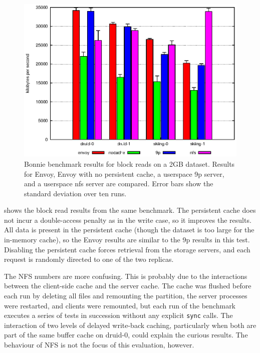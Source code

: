 \begin{figure}[t]
\centering
\includegraphics[width=\figwidth]{figures/bonnie-read}
\caption[Bonnie benchmark results for block reads]{Bonnie benchmark results for block reads on a 2GB dataset. Results for Envoy, Envoy with no persistent cache, a userspace 9p server, and a userspace nfs server are compared. Error bars show the standard deviation over ten runs.}
\label{fig:bonnie-read}
\end{figure}

 shows the block read results from the same benchmark. The persistent cache does not incur a double-access penalty as in the write case, so it improves the results. All data is present in the persistent cache (though the dataset is too large for the in-memory cache), so the Envoy results are similar to the 9p results in this test. Disabling the persistent cache forces retrieval from the storage servers, and each request is randomly directed to one of the two replicas.

The NFS numbers are more confusing. This is probably due to the interactions between the client-side cache and the server cache. The cache was flushed before each run by deleting all files and remounting the partition, the server processes were restarted, and clients were remounted, but each run of the benchmark executes a series of tests in succession without any explicit \texttt{sync} calls. The interaction of two levels of delayed write-back caching, particularly when both are part of the same buffer cache on druid-0, could explain the curious results. The behaviour of NFS is not the focus of this evaluation, however.

